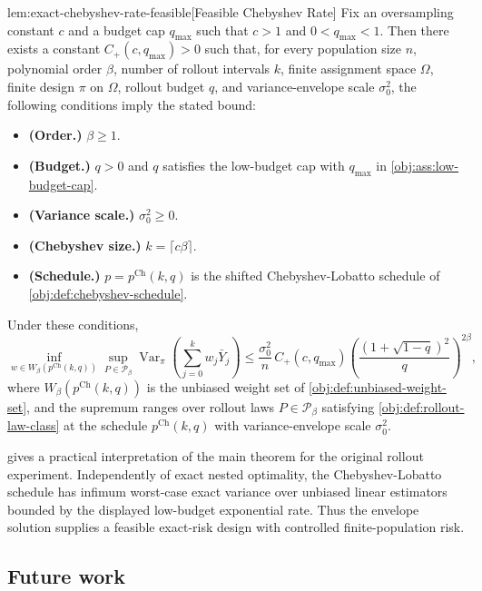 \begin{propositionv}{lem:exact-chebyshev-rate-feasible}[Feasible Chebyshev Rate]
Fix an oversampling constant \(c\) and a budget cap \(q_{\max}\) such that \(c>1\) and \(0<q_{\max}<1\). Then there exists a constant \(C_+(c,q_{\max})>0\) such that, for every population size \(n\), polynomial order \(\beta\), number of rollout intervals \(k\), finite assignment space \(\Omega\), finite design \(\pi\) on \(\Omega\), rollout budget \(q\), and variance-envelope scale \(\sigma_0^2\), the following conditions imply the stated bound:
\begin{itemize}
\item \textbf{(Order.)} \(\beta\ge 1\).
\item \textbf{(Budget.)} \(q>0\) and \(q\) satisfies the low-budget cap with \(q_{\max}\) in \cref{obj:ass:low-budget-cap}.
\item \textbf{(Variance scale.)} \(\sigma_0^2\ge 0\).
\item \textbf{(Chebyshev size.)} \(k=\lceil c\beta\rceil\).
\item \textbf{(Schedule.)} \(p=p^{\mathrm{Ch}}(k,q)\) is the shifted Chebyshev-Lobatto schedule of \cref{obj:def:chebyshev-schedule}.
\end{itemize}
Under these conditions,
\[
\inf_{w\in W_\beta(p^{\mathrm{Ch}}(k,q))}
\sup_{P\in\mathcal P_\beta}
\operatorname{Var}_\pi\!\left(\sum_{j=0}^k w_j\bar Y_j\right)
\le
\frac{\sigma_0^2}{n}\,
C_+(c,q_{\max})
\left(\frac{(1+\sqrt{1-q})^2}{q}\right)^{2\beta},
\]
where \(W_\beta(p^{\mathrm{Ch}}(k,q))\) is the unbiased weight set of \cref{obj:def:unbiased-weight-set}, and the supremum ranges over rollout laws \(P\in\mathcal P_\beta\) satisfying \cref{obj:def:rollout-law-class} at the schedule \(p^{\mathrm{Ch}}(k,q)\) with variance-envelope scale \(\sigma_0^2\).
\end{propositionv}

 gives a practical interpretation of the main theorem for the original rollout experiment. Independently of exact nested optimality, the Chebyshev-Lobatto schedule has infimum worst-case exact variance over unbiased linear estimators bounded by the displayed low-budget exponential rate. Thus the envelope solution supplies a feasible exact-risk design with controlled finite-population risk.

\subsection{Future work}

